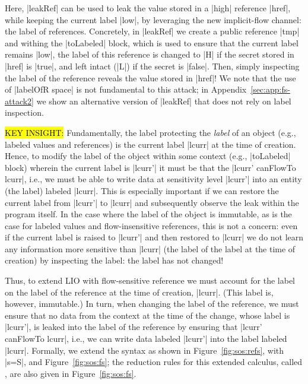\noindent
%
Here, |leakRef| can be used to leak the value stored in a |high| reference
|href|, while keeping the current label |low|, by leveraging the new
implicit-flow channel: the label of references.
%
Concretely, in |leakRef| we create a public reference |tmp| and withing the
|toLabeled| block, which is used to ensure that the current label remains
|low|, the label of this reference is changed to |H| if the secret stored in
|href| is |true|, and left intact (|L|) if the secret is |false|.
%
Then, simply inspecting the label of the reference reveals the value stored in
|href|!
%
We note that the use of |labelOfR space| is not fundamental to this attack; in
Appendix~\ref{sec:app:fs-attack2} we show an alternative version of |leakRef|
that does not rely on label inspection.

\hl{KEY INSIGHT:}
Fundamentally, the label protecting the \emph{label} of an object (e.g.,
labeled values and references) is the current label |lcurr| at the time of
creation.
%
Hence, to modify the label of the object within some context (e.g., |toLabeled|
block) wherein the current label is |lcurr'| it must be that the |lcurr'
canFlowTo lcurr|, i.e., we must be able to write data at sensitivity level
|lcurr'| into an entity (the label) labeled |lcurr|.
%
This is especially important if we can restore the current label from |lcurr'|
to |lcurr| and subsequently observe the leak within the program itself.
%
In the case where the label of the object is immutable, as is the case for
labeled values and flow-insensitive references, this is not a concern: even if
the current label is raised to |lcurr'| and then restored to |lcurr| we do not
learn any information more sensitive than |lcurr| (the label of the label at
the time of creation) by inspecting the label: the label has not changed!
%

\concept{\liofs{}}
Thus, to extend LIO with flow-sensitive reference we must account for the label
on the label of the reference at the time of creation, |lcurr|.
%
(This label is, however, immutable.)
%
In turn, when changing the label of the reference, we must ensure that no data
from the context at the time of the change, whose label is |lcurr'|, is leaked
into the label of the reference by ensuring that |lcurr' canFlowTo lcurr|,
i.e., we can write data labeled |lcurr'| into the label labeled |lcurr|.
%
Formally, we extend the \lio{} syntax as shown in Figure~\ref{fig:sos:refs},
with |s=S|, and Figure~\ref{fig:sos:fs};
%
the reduction rules for this extended calculus, called \liofs{}, are also
given in Figure~\ref{fig:sos:fs}.

